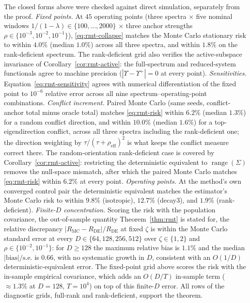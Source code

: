 The closed forms above were checked against direct simulation, separately from the proof.
\emph{Fixed points.}
At $45$ operating points (three spectra $\times$ five nominal windows $1/(1-\lambda) \in \{100,\dots,2000\}$ $\times$ three anchor strengths $\rho \in \{10^{-3}, 10^{-2}, 10^{-1}\}$), \eqref{eq:rmt-collapse} matches the Monte Carlo stationary risk to within $4.0\%$ (median $1.0\%$) across all three spectra, and within $1.8\%$ on the rank-deficient spectrum.
The rank-deficient grid also verifies the active-subspace invariance of Corollary~\ref{cor:rmt-active}: the full-spectrum and reduced-system functionals agree to machine precision ($|\Upsilon-\Upsilon^+| = 0$ at every point).
\emph{Sensitivities.}
Equation~\eqref{eq:rmt-sensitivity} agrees with numerical differentiation of the fixed point to $10^{-6}$ relative error across all nine spectrum--operating-point combinations.
\emph{Conflict increment.}
Paired Monte Carlo (same seeds, conflict-anchor total minus oracle total) matches \eqref{eq:rmt-risk} within $6.2\%$ (median $1.3\%$) for a random conflict direction, and within $10.0\%$ (median $1.6\%$) for a top-eigendirection conflict, across all three spectra including the rank-deficient one; the direction weighting by $\tau/(\tau+\rho_{\mathrm{eff}})^2$ is what keeps the conflict measure correct there.
The random-orientation rank-deficient case is covered by Corollary~\ref{cor:rmt-active}: restricting the deterministic equivalent to $\operatorname{range}(\Sigma)$ removes the null-space mismatch, after which the paired Monte Carlo matches \eqref{eq:rmt-risk} within $6.2\%$ at every point.
\emph{Operating points.}
At the method's own converged control pair the deterministic equivalent matches the estimator's Monte Carlo risk to within $9.8\%$ (isotropic), $12.7\%$ (decay3), and $1.9\%$ (rank-deficient).
\emph{Finite-$D$ concentration.}
Scoring the risk with the population covariance, the out-of-sample quantity Theorem~\ref{thm:rmt} is stated for, the relative discrepancy $|R_{\mathrm{MC}}-R_{\mathrm{DE}}|/R_{\mathrm{DE}}$ at fixed $\zeta$ is within the Monte Carlo standard error at every $D \in \{64,128,256,512\}$ over $\zeta \in \{1,2\}$ and $\rho \in \{10^{-2},10^{-1}\}$: for $D \ge 128$ the maximum relative bias is $1.1\%$ and the median $|\text{bias}|/\text{s.e.}$ is $0.66$, with no systematic growth in $D$, consistent with an $O(1/D)$ deterministic-equivalent error.
The fixed-point grid above scores the risk with the in-sample empirical covariance, which adds an $O(D/T)$ in-sample term ($\approx 1.3\%$ at $D=128$, $T=10^4$) on top of this finite-$D$ error.
All rows of the diagnostic grids, full-rank and rank-deficient, support the theorem.

